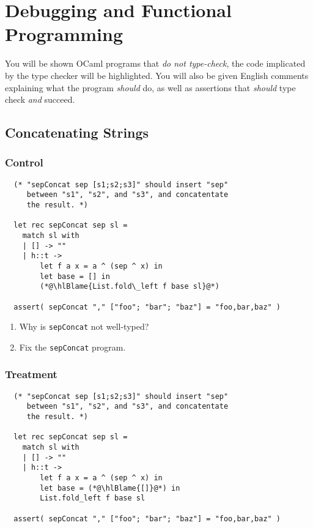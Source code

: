 \documentclass{article}
\newcommand\hlBlame[1]{\colorbox{red!25}{#1}}
\begin{document}
\section{Debugging and Functional Programming}

You will be shown OCaml programs that \emph{do not type-check}, the code
implicated by the type checker will be \hlBlame{highlighted}. You will
also be given English comments explaining what the program \emph{should}
do, as well as assertions that \emph{should} type check \emph{and} succeed.


\subsection{Concatenating Strings}

\subsubsection{Control}
\begin{lstlisting}
  (* "sepConcat sep [s1;s2;s3]" should insert "sep"
     between "s1", "s2", and "s3", and concatentate
     the result. *)

  let rec sepConcat sep sl =
    match sl with
    | [] -> ""
    | h::t ->
        let f a x = a ^ (sep ^ x) in
        let base = [] in
        (*@\hlBlame{List.fold\_left f base sl}@*)

  assert( sepConcat "," ["foo"; "bar"; "baz"] = "foo,bar,baz" )
\end{lstlisting}

\begin{enumerate}
\item Why is \verb!sepConcat! not well-typed?
\item Fix the \verb!sepConcat! program.
\end{enumerate}

\subsubsection{Treatment}
\begin{lstlisting}
  (* "sepConcat sep [s1;s2;s3]" should insert "sep"
     between "s1", "s2", and "s3", and concatentate
     the result. *)

  let rec sepConcat sep sl =
    match sl with
    | [] -> ""
    | h::t ->
        let f a x = a ^ (sep ^ x) in
        let base = (*@\hlBlame{[]}@*) in
        List.fold_left f base sl

  assert( sepConcat "," ["foo"; "bar"; "baz"] = "foo,bar,baz" )
\end{lstlisting}
\end{document}
